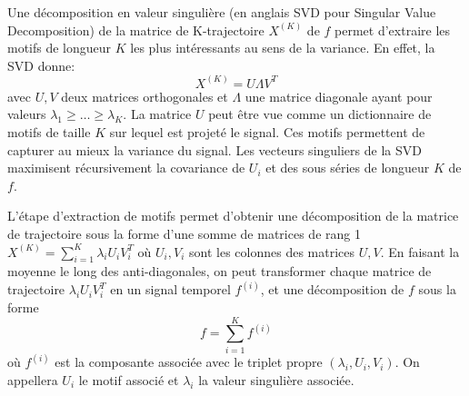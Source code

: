 \documentclass{gretsi}
\def\HH{\mathcal H}
\newcommand{\R}{\mathbb R}
\begin{document}


Une décomposition en valeur singulière (en anglais SVD pour Singular Value Decomposition) de la matrice de K-trajectoire $X^{(K)}$ de $f$ permet d'extraire les motifs de longueur $K$ les plus intéressants au sens de la variance.
En effet, la SVD donne: 
\begin{equation}
    X^{(K)} = U \Lambda V^T
\end{equation}
avec $U, V$ deux matrices orthogonales et $\Lambda$ une matrice diagonale ayant pour valeurs $\lambda_1\ge \dots\ge \lambda_K$.
La matrice $U$ peut être vue comme un dictionnaire de motifs de taille $K$ sur lequel est projeté le signal.
Ces motifs permettent de capturer au mieux la variance du signal.
Les vecteurs singuliers de la SVD maximisent récursivement la covariance de $U_i$ et des sous séries de longueur $K$ de $f$.



L'étape d'extraction de motifs permet d'obtenir une décomposition de la matrice de trajectoire sous la forme d'une somme de matrices de rang 1 $X^{(K)} = \sum_{i=1}^K \lambda_i U_iV_i^T$ où  $U_i, V_i$ sont les colonnes des matrices $U, V$.
En faisant la moyenne le long des anti-diagonales, on peut transformer chaque matrice de trajectoire $\lambda_iU_iV_i^T$  en un signal temporel $f^{(i)}$, et une décomposition de $f$ sous la forme 
\begin{equation}
    f = \sum_{i=1}^K f^{(i)}
\end{equation}
où $f^{(i)} $ est la composante associée avec le triplet propre $(\lambda_i, U_i, V_i)$.
On appellera $U_i$ le motif associé et $\lambda_i$ la valeur singulière associée.


\end{document}
